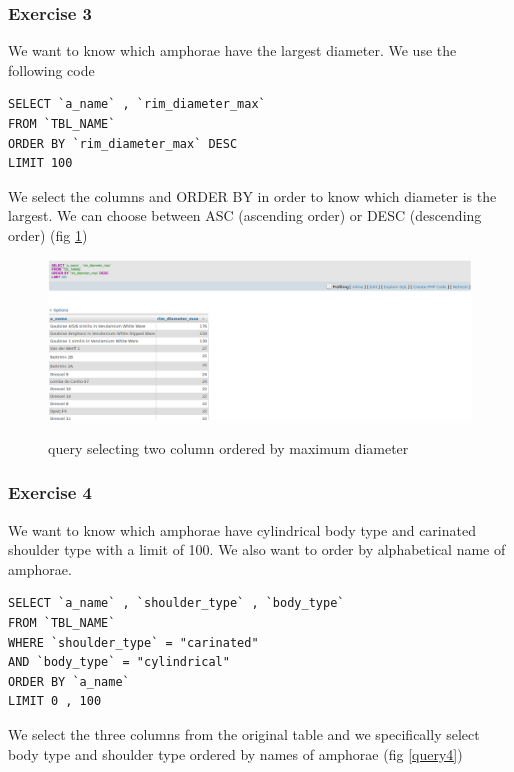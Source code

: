 \documentclass[10pt,a4paper]{article}
\begin{document}
\subsubsection{Exercise 3}

We want to know which amphorae have the largest diameter. We use the following code

\begin{verbatim}
SELECT `a_name` , `rim_diameter_max`
FROM `TBL_NAME`
ORDER BY `rim_diameter_max` DESC
LIMIT 100 
\end{verbatim}

We select the columns and ORDER BY in order to know which diameter is the largest. We can choose between ASC (ascending order) or DESC (descending order) (fig \ref{query3})

\begin{figure}[hdp]
\centering
\includegraphics[scale=0.30]{query3.png}
\label{query3}
\caption{query selecting two column ordered by maximum diameter}
\end{figure} 

\subsubsection{Exercise 4}

We want to know which amphorae have cylindrical body type and carinated shoulder type with a limit of 100. We also want to order by alphabetical name of amphorae. 

\begin{verbatim}
SELECT `a_name` , `shoulder_type` , `body_type`
FROM `TBL_NAME`
WHERE `shoulder_type` = "carinated"
AND `body_type` = "cylindrical"
ORDER BY `a_name`
LIMIT 0 , 100
\end{verbatim}

We select the three columns from the original table and we specifically select body type and shoulder type ordered by names of amphorae (fig \ref{query4})
\end{document}
